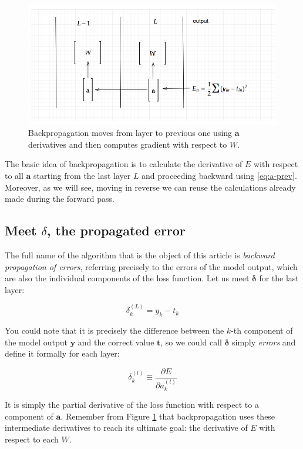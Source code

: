 \documentclass{article}
\begin{document}
\begin{figure}[H]
    \centering
    \includegraphics[width=0.6\linewidth]{images/backprop.png}
    \caption{Backpropagation moves from layer to previous one using $\boldsymbol{a}$ derivatives and then computes gradient with respect to $W$.}
    \label{fig:a-to-a}
\end{figure}


The basic idea of backpropagation is to calculate the derivative of $E$ with respect to all $\boldsymbol{a}$ starting from the last layer $L$ and proceeding backward using \eqref{eq:a-prev}. Moreover, as we will see, moving in reverse we can reuse the calculations already made during the forward pass.

\subsection{Meet $\delta$, the propagated error}\label{sec:meet-delta}

The full name of the algorithm that is the object of this article is \textit{backward propagation of errors}, referring precisely to the errors of the model output, which are also the individual components of the loss function. Let us meet $\boldsymbol{\delta}$ for the last layer:


\begin{equation}
\delta _{k}^{( L)} =y_{k} -t_{k} \label{eq:last-error}
\end{equation}

You could note that it is precisely the difference between the $k$-th component of the model output $\boldsymbol{y}$ and the correct value $\boldsymbol{t}$, so we could call $\boldsymbol{\delta}$ simply \textit{errors} and define it formally for each layer:


\begin{equation}
\delta _{k}^{( l)} \equiv \frac{\partial E}{\partial a_{k}^{( l)}} \label{eq:error}
\end{equation}

It is simply the partial derivative of the loss function with respect to a component of $\boldsymbol{a}$. Remember from Figure \ref{fig:a-to-a} that backpropagation uses these intermediate derivatives to reach its ultimate goal: the derivative of $E$ with respect to each $W$.
\end{document}
